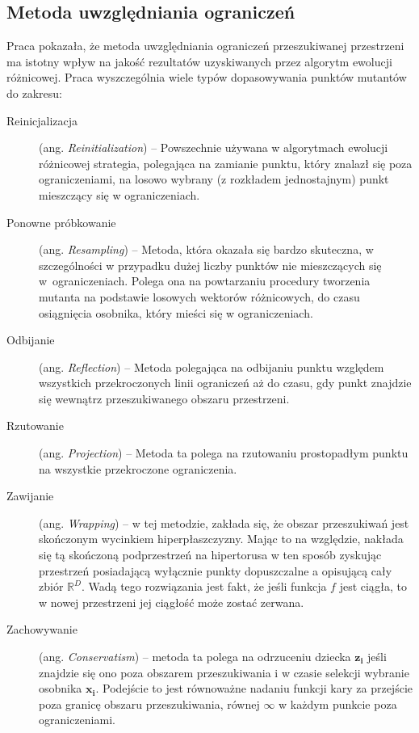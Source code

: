 \documentclass[12pt,a4paper]{report}
\begin{document}
{{{\subsection{Metoda uwzględniania ograniczeń}
\par{
Praca \cite{Boundary} pokazała, że metoda uwzględniania ograniczeń przeszukiwanej przestrzeni ma istotny wpływ na jakość rezultatów uzyskiwanych przez algorytm ewolucji różnicowej. Praca wyszczególnia wiele typów dopasowywania punktów mutantów do zakresu:
\begin{description}
\item[Reinicjalizacja] (ang. \emph{Reinitialization}) -- Powszechnie używana w algorytmach ewolucji różnicowej strategia, polegająca na zamianie punktu, który znalazł się poza ograniczeniami, na losowo wybrany (z rozkładem jednostajnym) punkt mieszczący się w ograniczeniach.
\item[Ponowne próbkowanie] (ang. \emph{Resampling}) -- Metoda, która okazała się bardzo skuteczna, w szczególności w przypadku dużej liczby punktów nie mieszczących się w~ograniczeniach. Polega ona na powtarzaniu procedury tworzenia mutanta na podstawie losowych wektorów różnicowych, do czasu osiągnięcia osobnika, który mieści się w ograniczeniach.
\item[Odbijanie] (ang. \emph{Reflection}) -- Metoda polegająca na odbijaniu punktu względem wszystkich przekroczonych linii ograniczeń aż do czasu, gdy punkt znajdzie się wewnątrz przeszukiwanego obszaru przestrzeni.
\item[Rzutowanie] (ang. \emph{Projection}) -- Metoda ta polega na rzutowaniu prostopadłym punktu na wszystkie przekroczone ograniczenia.
\item[Zawijanie] (ang. \emph{Wrapping}) -- w tej metodzie, zakłada się, że obszar przeszukiwań jest skończonym wycinkiem hiperpłaszczyzny. Mając to na względzie, nakłada się tą skończoną podprzestrzeń na hipertorusa w ten sposób zyskując przestrzeń posiadającą wyłącznie punkty dopuszczalne a opisującą cały zbiór $\mathbb{R}^D$. Wadą tego rozwiązania jest fakt, że jeśli funkcja $f$ jest ciągła, to w nowej przestrzeni jej ciągłość może zostać zerwana.
\item[Zachowywanie] (ang. \emph{Conservatism}) -- metoda ta polega na odrzuceniu dziecka $\mathbf{z_i}$ jeśli znajdzie się ono poza obszarem przeszukiwania i w czasie selekcji wybranie osobnika $\mathbf{x_i}$. Podejście to jest równoważne nadaniu funkcji kary za przejście poza granicę obszaru przeszukiwania, równej $\infty$ w każdym punkcie poza ograniczeniami.

\end{description}}}}}
\end{document}

